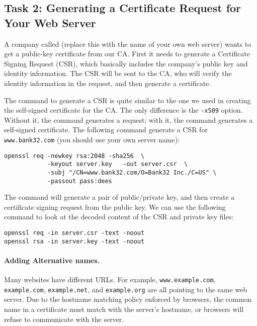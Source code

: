 \subsection{Task 2: Generating a Certificate Request for Your Web Server}

A company called \pkiserver (replace this with the name of your own 
web server) wants to get a public-key certificate 
from our CA. First it needs to
generate a Certificate Signing Request (CSR), 
which basically includes the company's public key and identity information. 
The CSR will be sent to the CA, who will verify the identity information
in the request, and then generate a certificate. 


The command to generate a CSR is quite similar to the one
we used in creating the self-signed certificate for the CA. The only
difference is the \texttt{-x509} option. Without it, the command 
generates a request; with it, the command generates a self-signed 
certificate. The following command generate a CSR for 
\texttt{www.bank32.com}  (you should use your own server name):

\begin{lstlisting}
openssl req -newkey rsa:2048 -sha256  \
            -keyout server.key   -out server.csr  \
            -subj "/CN=www.bank32.com/O=Bank32 Inc./C=US" \
            -passout pass:dees  
\end{lstlisting}

The command will generate a pair of public/private key, and 
then create a certificate signing request from the public key. 
We can use the following command 
to look at the decoded content of the  CSR and private key files: 

\begin{lstlisting}
openssl req -in server.csr -text -noout
openssl rsa -in server.key -text -noout 
\end{lstlisting}
 


\paragraph{Adding Alternative names.}
Many websites have different URLs. For example, \texttt{www.example.com},
\texttt{example.com}, \texttt{example.net}, and \texttt{example.org} 
are all pointing to the same web server.
Due to the hostname matching policy
enforced by browsers, the common name in a certificate
must match with the server's hostname, or browsers
will refuse to communicate with the server. 

